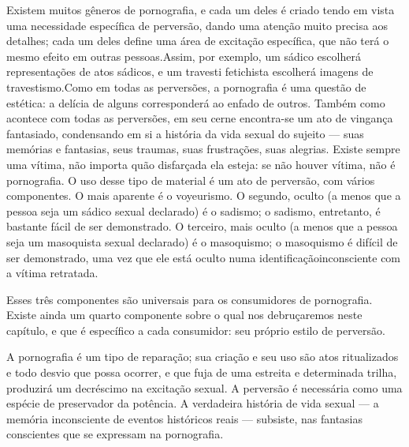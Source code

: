 Existem muitos gêneros de pornografia, e cada um deles é criado
tendo em vista uma necessidade específica de perversão, dando uma
atenção muito precisa aos detalhes; cada um deles define uma área de
excitação específica, que não terá o mesmo efeito em outras pessoas.\idxpornoplat[|)]
Assim, por exemplo, um sádico escolherá representações de atos sádicos,
e um travesti fetichista escolherá imagens de travestismo.\idxtravemporn[|)] Como em
todas as perversões, a pornografia é uma questão de estética: a delícia
de alguns corresponderá ao enfado de outros. Também como acontece com
todas as perversões, em seu cerne encontra-se um ato de vingança\idxpervmotiv{}
fantasiado,\idxfantaporn{} condensando em si a história da vida sexual do sujeito ---
suas memórias e fantasias,\idxpornofant{} seus traumas, suas frustrações, suas
alegrias. Existe sempre uma vítima,\idxpornoviti{} não importa quão disfarçada ela
esteja: se não houver vítima, não é pornografia. O uso desse tipo de
material é um ato de perversão, com vários componentes. O mais aparente
é o voyeurismo.\idxvoy{} O segundo, oculto (a menos que a pessoa seja um sádico
sexual declarado) é o sadismo;\idxsadiporn{} o sadismo, entretanto, é bastante fácil
de ser demonstrado. O terceiro, mais oculto (a menos que a pessoa seja
um masoquista sexual declarado)\idxmasoqpor{} é o masoquismo; o masoquismo é difícil
de ser demonstrado, uma vez que ele está oculto numa identificação\idxvinga[|)]
inconsciente com a vítima retratada.

Esses três componentes são universais para os consumidores de
pornografia. Existe ainda um quarto componente sobre o qual nos
debruçaremos neste capítulo, e que é específico a cada consumidor: seu
próprio estilo de perversão.

A pornografia é um tipo de reparação; sua criação e seu uso são atos
ritualizados e todo desvio que possa ocorrer, e que fuja de uma
estreita e determinada trilha, produzirá um decréscimo na excitação
sexual. A perversão é necessária como uma espécie de preservador da
potência. A verdadeira história de vida sexual --- a memória
inconsciente de eventos históricos reais --- subsiste, nas fantasias
conscientes que se expressam na pornografia.

